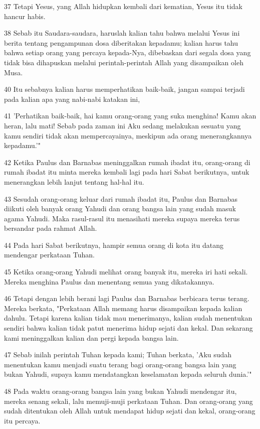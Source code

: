 \par 37 Tetapi Yesus, yang Allah hidupkan kembali dari kematian, Yesus itu tidak hancur habis.
\par 38 Sebab itu Saudara-saudara, haruslah kalian tahu bahwa melalui Yesus ini berita tentang pengampunan dosa diberitakan kepadamu; kalian harus tahu bahwa setiap orang yang percaya kepada-Nya, dibebaskan dari segala dosa yang tidak bisa dihapuskan melalui perintah-perintah Allah yang disampaikan oleh Musa.
\par 40 Itu sebabnya kalian harus memperhatikan baik-baik, jangan sampai terjadi pada kalian apa yang nabi-nabi katakan ini,
\par 41 'Perhatikan baik-baik, hai kamu orang-orang yang suka menghina! Kamu akan heran, lalu mati! Sebab pada zaman ini Aku sedang melakukan sesuatu yang kamu sendiri tidak akan mempercayainya, meskipun ada orang menerangkannya kepadamu.'"
\par 42 Ketika Paulus dan Barnabas meninggalkan rumah ibadat itu, orang-orang di rumah ibadat itu minta mereka kembali lagi pada hari Sabat berikutnya, untuk menerangkan lebih lanjut tentang hal-hal itu.
\par 43 Sesudah orang-orang keluar dari rumah ibadat itu, Paulus dan Barnabas diikuti oleh banyak orang Yahudi dan orang bangsa lain yang sudah masuk agama Yahudi. Maka rasul-rasul itu menasihati mereka supaya mereka terus bersandar pada rahmat Allah.
\par 44 Pada hari Sabat berikutnya, hampir semua orang di kota itu datang mendengar perkataan Tuhan.
\par 45 Ketika orang-orang Yahudi melihat orang banyak itu, mereka iri hati sekali. Mereka menghina Paulus dan menentang semua yang dikatakannya.
\par 46 Tetapi dengan lebih berani lagi Paulus dan Barnabas berbicara terus terang. Mereka berkata, "Perkataan Allah memang harus disampaikan kepada kalian dahulu. Tetapi karena kalian tidak mau menerimanya, kalian sudah menentukan sendiri bahwa kalian tidak patut menerima hidup sejati dan kekal. Dan sekarang kami meninggalkan kalian dan pergi kepada bangsa lain.
\par 47 Sebab inilah perintah Tuhan kepada kami; Tuhan berkata, 'Aku sudah menentukan kamu menjadi suatu terang bagi orang-orang bangsa lain yang bukan Yahudi, supaya kamu mendatangkan keselamatan kepada seluruh dunia.'"
\par 48 Pada waktu orang-orang bangsa lain yang bukan Yahudi mendengar itu, mereka senang sekali, lalu memuji-muji perkataan Tuhan. Dan orang-orang yang sudah ditentukan oleh Allah untuk mendapat hidup sejati dan kekal, orang-orang itu percaya.
